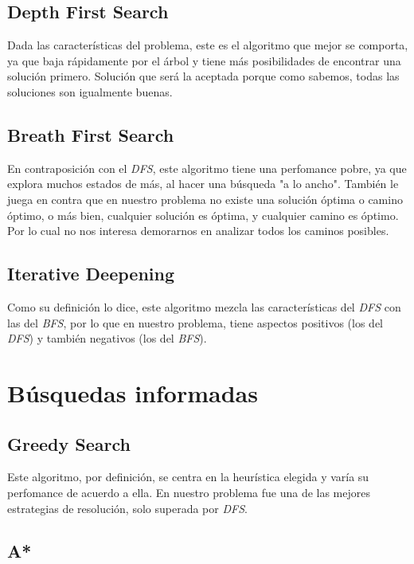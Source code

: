 \documentclass[a4paper,10pt]{article}
\begin{document}
    \subsection{Depth First Search}
    Dada las características del problema, este es el algoritmo que mejor se comporta, ya que baja rápidamente por el árbol y tiene más posibilidades de encontrar una solución primero.
    Solución que será la aceptada porque como sabemos, todas las soluciones son igualmente buenas.
    
    \subsection{Breath First Search}
    En contraposición con el \textit{DFS}, este algoritmo tiene una perfomance pobre, ya que explora muchos estados de más, al hacer una búsqueda "a lo ancho". También le juega en 
    contra que en nuestro problema no existe una solución óptima o camino óptimo, o más bien, cualquier solución es óptima, y cualquier camino es óptimo. Por lo cual no nos interesa 
    demorarnos en analizar todos los caminos posibles.
    
    \subsection{Iterative Deepening}
    Como su definición lo dice, este algoritmo mezcla las características del \textit{DFS} con las del \textit{BFS}, por lo que en nuestro problema, tiene aspectos positivos (los del 
    \textit{DFS}) y también negativos (los del \textit{BFS}). 
 
\section{Búsquedas informadas}
    
    \subsection{Greedy Search}
    
    Este algoritmo, por definición, se centra en la heurística elegida y varía su perfomance de acuerdo a ella. En nuestro problema fue una de las mejores estrategias de resolución, 
    solo superada por \textit{DFS}.

    \subsection{A*}
    
\end{document}
